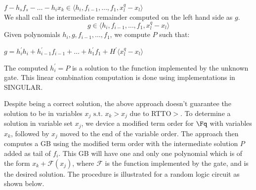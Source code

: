 $f - h_sf_s -\dots-h_ix_k \in \langle h_i,f_{i-1},\dots,f_1, x_l^q-x_l\rangle$\\
We shall call the intermediate remainder computed on the left hand side as $g$.
\begin{equation}
g \in \langle h_i,f_{i-1},\dots,f_1, x_l^q-x_l\rangle
\end{equation}
Given polynomials $h_i, g, f_{i-1},\dots,f_1$, we compute $P$ such that:

 $g = h_i^{'}h_i+h_{i-1}^{'}f_{i-1}+\dots+h_1^{'}f_1+H^{'}\langle x_l^q-x_l\rangle$

The computed $h_i^{'} = P$ is a solution to the function implemented by the unknown gate. This linear combination computation is done using implementations in SINGULAR\cite{DGPS_410}. 

Despite being a correct solution, the above approach doesn't guarantee the solution to be in variables $x_j \text{ s.t. } x_k>x_j$ due to RTTO$>$. To determine a solution in variable set $x_j$, we device a modified term order for $\Fq$ with variables $x_k$, followed by $x_j$ moved to the end of the variable order. The approach then computes a GB using the modified term order with the intermediate solution $P$ added as tail of $f_i$. This GB will have one and only one polynomial which is of the form $x_k + \mathcal{F}(x_j)$, where $\mathcal{F}$ is the function implemented by the gate, and is the desired solution. The procedure is illustrated for a random logic circuit as shown below.

